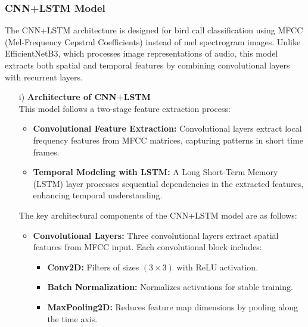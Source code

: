       \subsubsection{CNN+LSTM Model}
      The CNN+LSTM architecture is designed for bird call classification using MFCC (Mel-Frequency Cepstral Coefficients) instead of mel spectrogram images. Unlike EfficientNetB3, which processes image representations of audio, this model extracts both spatial and temporal features by combining convolutional layers with recurrent layers.
      \begin{itemize}
            \item[i)] \textbf{Architecture of CNN+LSTM} \\
            This model follows a two-stage feature extraction process:

            \begin{itemize}
            \item \textbf{Convolutional Feature Extraction:} Convolutional layers extract local frequency features from MFCC matrices, capturing patterns in short time frames.
            \item \textbf{Temporal Modeling with LSTM:} A Long Short-Term Memory (LSTM) layer processes sequential dependencies in the extracted features, enhancing temporal understanding.
            \end{itemize}

            The key architectural components of the CNN+LSTM model are as follows:

            \begin{itemize}
            \item \textbf{Convolutional Layers:} Three convolutional layers extract spatial features from MFCC input. Each convolutional block includes:
            \begin{itemize}
                  \item \textbf{Conv2D:} Filters of sizes $(3 \times 3)$ with ReLU activation.
                  \item \textbf{Batch Normalization:} Normalizes activations for stable training.
                  \item \textbf{MaxPooling2D:} Reduces feature map dimensions by pooling along the time axis.
            \end{itemize}
            

\end{itemize}
\end{itemize}
